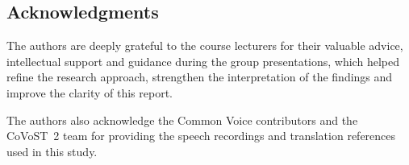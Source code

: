 \begin{samepage}
\section*{Acknowledgments}

The authors are deeply grateful to the course lecturers for their valuable
advice, intellectual support and guidance during the group presentations,
which helped refine the research approach, strengthen the interpretation of
the findings and improve the clarity of this report.\par

The authors also acknowledge the Common Voice
contributors and the CoVoST~2 team for providing the speech recordings and
translation references used in this study.\par
\end{samepage}
